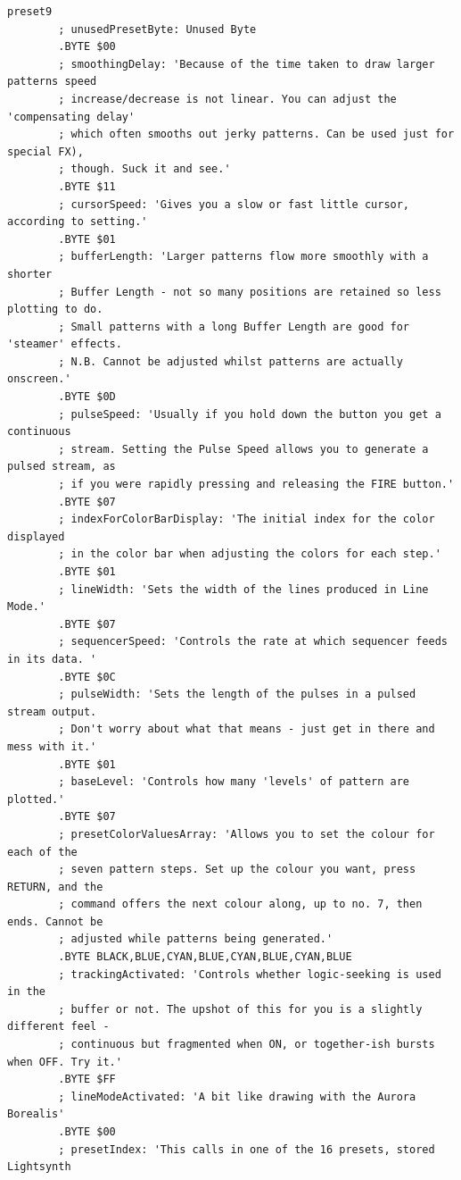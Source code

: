 \begin{lstlisting}[basicstyle=\ttfamily\tiny,caption=Source code for Preset 9.]
preset9
        ; unusedPresetByte: Unused Byte
        .BYTE $00
        ; smoothingDelay: 'Because of the time taken to draw larger patterns speed
        ; increase/decrease is not linear. You can adjust the 'compensating delay'
        ; which often smooths out jerky patterns. Can be used just for special FX),
        ; though. Suck it and see.'
        .BYTE $11
        ; cursorSpeed: 'Gives you a slow or fast little cursor, according to setting.'
        .BYTE $01
        ; bufferLength: 'Larger patterns flow more smoothly with a shorter
        ; Buffer Length - not so many positions are retained so less plotting to do.
        ; Small patterns with a long Buffer Length are good for 'steamer' effects.
        ; N.B. Cannot be adjusted whilst patterns are actually onscreen.'
        .BYTE $0D
        ; pulseSpeed: 'Usually if you hold down the button you get a continuous
        ; stream. Setting the Pulse Speed allows you to generate a pulsed stream, as
        ; if you were rapidly pressing and releasing the FIRE button.'
        .BYTE $07
        ; indexForColorBarDisplay: 'The initial index for the color displayed
        ; in the color bar when adjusting the colors for each step.'
        .BYTE $01
        ; lineWidth: 'Sets the width of the lines produced in Line Mode.'
        .BYTE $07
        ; sequencerSpeed: 'Controls the rate at which sequencer feeds in its data. '
        .BYTE $0C
        ; pulseWidth: 'Sets the length of the pulses in a pulsed stream output.
        ; Don't worry about what that means - just get in there and mess with it.'
        .BYTE $01
        ; baseLevel: 'Controls how many 'levels' of pattern are plotted.'
        .BYTE $07
        ; presetColorValuesArray: 'Allows you to set the colour for each of the
        ; seven pattern steps. Set up the colour you want, press RETURN, and the
        ; command offers the next colour along, up to no. 7, then ends. Cannot be
        ; adjusted while patterns being generated.'
        .BYTE BLACK,BLUE,CYAN,BLUE,CYAN,BLUE,CYAN,BLUE
        ; trackingActivated: 'Controls whether logic-seeking is used in the
        ; buffer or not. The upshot of this for you is a slightly different feel -
        ; continuous but fragmented when ON, or together-ish bursts when OFF. Try it.'
        .BYTE $FF
        ; lineModeActivated: 'A bit like drawing with the Aurora Borealis'
        .BYTE $00
        ; presetIndex: 'This calls in one of the 16 presets, stored Lightsynth

\end{lstlisting}
